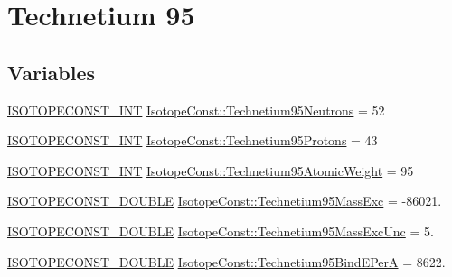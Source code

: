 \hypertarget{group___isotope_const-_technetium-_tc95}{}\section{Technetium 95}
\label{group___isotope_const-_technetium-_tc95}
\subsection*{Variables}
\begin{DoxyCompactItemize}
\item 
\mbox{\hyperlink{group___isotope_const-_macros_ga5f18360b3e99483a35c32d789e62621c}{I\+S\+O\+T\+O\+P\+E\+C\+O\+N\+S\+T\+\_\+\+I\+NT}} \mbox{\hyperlink{group___isotope_const-_technetium-_tc95_ga6c417e75273666b345a21f84874ac170}{Isotope\+Const\+::\+Technetium95\+Neutrons}} = 52
\item 
\mbox{\hyperlink{group___isotope_const-_macros_ga5f18360b3e99483a35c32d789e62621c}{I\+S\+O\+T\+O\+P\+E\+C\+O\+N\+S\+T\+\_\+\+I\+NT}} \mbox{\hyperlink{group___isotope_const-_technetium-_tc95_ga9aec2473adb40de1a687b79d3cc26898}{Isotope\+Const\+::\+Technetium95\+Protons}} = 43
\item 
\mbox{\hyperlink{group___isotope_const-_macros_ga5f18360b3e99483a35c32d789e62621c}{I\+S\+O\+T\+O\+P\+E\+C\+O\+N\+S\+T\+\_\+\+I\+NT}} \mbox{\hyperlink{group___isotope_const-_technetium-_tc95_gae630d69dedf262891ffca1fe56d96fb0}{Isotope\+Const\+::\+Technetium95\+Atomic\+Weight}} = 95
\item 
\mbox{\hyperlink{group___isotope_const-_macros_ga8f45a7272ce02c0b4c65c44636ed719a}{I\+S\+O\+T\+O\+P\+E\+C\+O\+N\+S\+T\+\_\+\+D\+O\+U\+B\+LE}} \mbox{\hyperlink{group___isotope_const-_technetium-_tc95_ga5c0129255ff90c6e1547b113cf525c91}{Isotope\+Const\+::\+Technetium95\+Mass\+Exc}} = -\/86021.
\item 
\mbox{\hyperlink{group___isotope_const-_macros_ga8f45a7272ce02c0b4c65c44636ed719a}{I\+S\+O\+T\+O\+P\+E\+C\+O\+N\+S\+T\+\_\+\+D\+O\+U\+B\+LE}} \mbox{\hyperlink{group___isotope_const-_technetium-_tc95_ga511e640611fc678f8f2356dd64a87491}{Isotope\+Const\+::\+Technetium95\+Mass\+Exc\+Unc}} = 5.
\item 
\mbox{\hyperlink{group___isotope_const-_macros_ga8f45a7272ce02c0b4c65c44636ed719a}{I\+S\+O\+T\+O\+P\+E\+C\+O\+N\+S\+T\+\_\+\+D\+O\+U\+B\+LE}} \mbox{\hyperlink{group___isotope_const-_technetium-_tc95_ga4508e4401bc08e2558e86940c0fe0744}{Isotope\+Const\+::\+Technetium95\+Bind\+E\+PerA}} = 8622.
\item 

\end{DoxyCompactItemize}
